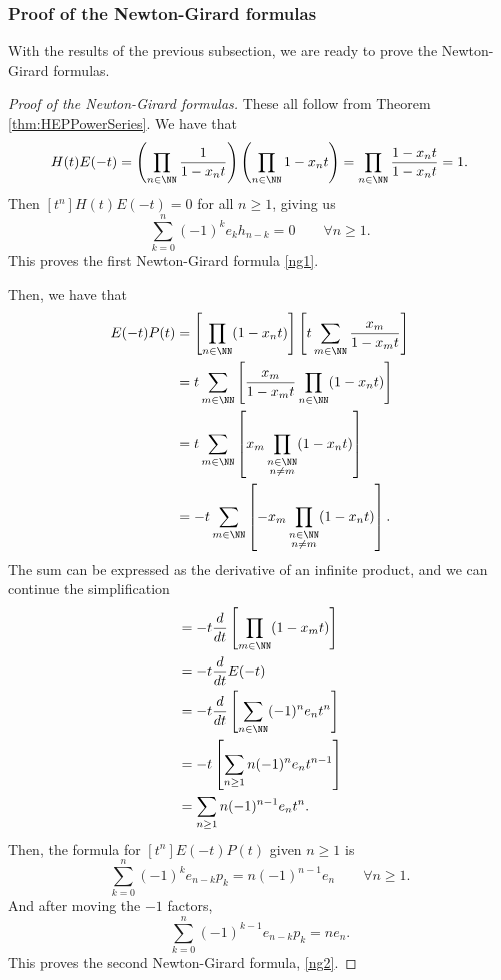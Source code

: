 \documentclass{article}
\begin{document}
\subsubsection{Proof of the Newton-Girard formulas}

With the results of the previous subsection, we are ready to prove the Newton-Girard formulas.

\begin{proof}
    [Proof of the Newton-Girard formulas]
    These all follow from Theorem \ref{thm:HEPPowerSeries}. We have that
    \[
        H(t)E(-t) 
        = \left(\prod_{n\in\NN}\frac{1}{1-x_nt}\right)\left(\prod_{n\in\NN}1-x_nt\right) 
        = \prod_{n\in\NN}\frac{1-x_nt}{1-x_nt} = 1.
    \]
    Then $[t^n] H(t)E(-t) = 0$ for all $n \geq 1$, giving us
    \[
        \sum_{k=0}^n (-1)^k e_k h_{n-k} = 0 \qquad \forall n\geq 1.
    \]
    This proves the first Newton-Girard formula \eqref{ng1}.

    Then, we have that
    \begin{align*}
        E(-t)P(t) &= \left[\prod_{n\in\NN}(1-x_nt)\right]\left[t\sum_{m\in\NN}\frac{x_m}{1-x_mt}\right] \\
                  &= t\sum_{m\in\NN}\left[\frac{x_m}{1-x_mt}\prod_{n\in\NN}(1-x_nt)\right] \\
                  &= t\sum_{m\in\NN} \left[x_m\prod_{\substack{n\in\NN \\ n\neq m}}(1-x_nt)\right] \\
                  &= -t\sum_{m\in\NN} \left[-x_m\prod_{\substack{n\in\NN \\ n\neq m}}(1-x_nt)\right].
    \end{align*}
    The sum can be expressed as the derivative of an infinite product, and we can continue the simplification
    \begin{align*}
                  &= -t\frac{d}{dt}\left[\prod_{m\in\NN}(1-x_mt)\right] \\
                  &= -t\frac{d}{dt}E(-t) \\
                  &= -t\frac{d}{dt}\left[\sum_{n\in\NN}(-1)^n e_nt^n\right] \\
                  &= -t\left[\sum_{n\geq 1}n(-1)^n e_nt^{n-1}\right] \\
                  &= \sum_{n\geq 1}n(-1)^{n-1} e_nt^n.
    \end{align*}
    Then, the formula for $[t^n]E(-t)P(t)$ given $n \geq 1$ is
    \[
        \sum_{k=0}^n (-1)^k e_{n-k}p_k = n(-1)^{n-1}e_n \qquad \forall n \geq 1.
    \]
    And after moving the $-1$ factors,
    \[
        \sum_{k=0}^n (-1)^{k-1} e_{n-k}p_k = ne_n.
    \]
    This proves the second Newton-Girard formula, \eqref{ng2}.


\end{proof}
\end{document}

